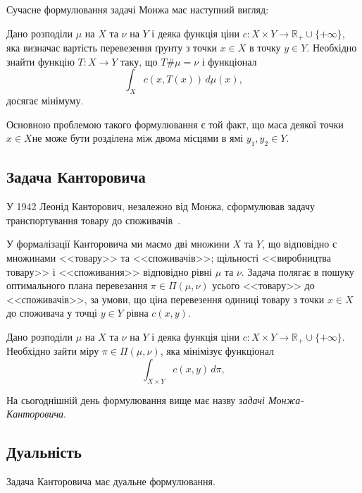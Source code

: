 Сучасне формулювання задачі Монжа має наступний вигляд:

\begin{definition}
    \label{def:monge-problem}
    Дано розподіли $\mu$ на $X$ та $\nu$ на $Y$ і деяка функція ціни $c : X \times Y \to \mathbb{R}_+ \cup \{+\infty\}$,
    яка визначає вартість перевезення ґрунту з точки $x \in X$ в точку $y \in Y$. 
    Необхідно знайти функцію $T : X \to Y$ таку, що $T \# \mu = \nu$ і функціонал
    $$
        \int_X c\left(x, T(x)\right)\, d\mu(x),
    $$
    досягає мінімуму.
\end{definition}

Основною проблемою такого формулювання є той факт, що маса деякої точки $x \in X $не може бути розділена між двома місцями
в ямі $y_1, y_2 \in Y$.

\subsection{Задача Канторовича}
\label{sec:kantorovich-problem}

У 1942 Леонід Канторович, незалежно від Монжа, сформулював задачу транспортування товару до споживачів~\cite{kantorovich2006}.

У формалізації Канторовича ми маємо дві множини $X$ та $Y$, що відповідно є множинами <<товару>> та <<споживачів>>;
щільності <<виробництва товару>> і <<споживання>> відповідно рівні $\mu$ та $\nu$.
Задача полягає в пошуку оптимального плана перевезання $\pi \in \Pi(\mu, \nu)$ усього <<товару>> до <<споживачів>>, за умови, що
ціна перевезення одиниці товару з точки $x \in X$ до споживача у точці $y \in Y$ рівна $c(x, y)$.

\begin{definition}
    \label{def:kantorovich-problem}
    Дано розподіли $\mu$ на $X$ та $\nu$ на $Y$ і деяка функція ціни $c : X \times Y \to \mathbb{R}_+ \cup \{+\infty\}$. 
    Необхідно зайти міру $\pi \in \Pi(\mu, \nu)$, яка мінімізує функціонал
    $$
        \int_{X \times Y} c(x, y)\, d\pi,
    $$
\end{definition}

На сьогоднішній день формулювання вище має назву \textit{задачі Монжа-Канторовича}.

\subsection{Дуальність}
Задача Канторовича має дуальне формулювання.

